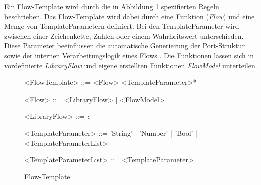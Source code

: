     Ein Flow-Template wird durch die in Abbildung \ref{gra:flow-template} spezifierten Regeln beschrieben.
    Das Flow-Template wird dabei durch eine Funktion (\textit{Flow}) und eine Menge von TemplateParametern definiert. 
    Bei den TemplateParameter wird zwischen einer Zeichenkette, Zahlen oder einem Wahrheitswert unterschieden. 
    Diese Parameter beeinflussen die automatische Generierung der Port-Struktur sowie der internen Verarbeitungslogik eines Flows \cite{99}.
    Die Funktionen lassen sich in vordefinierte \textit{LibraryFlow} und eigene erstellten Funktionen \textit{FlowModel} unterteilen.
    \begin{figure}[H]
        \centering
        \begin{grammar}
            <FlowTemplate> ::= <Flow> <TemplateParameter>*

            <Flow> ::= <LibraryFlow> | <FlowModel>
            
            <LibraryFlow> ::= $\epsilon$

            <TemplateParameter> ::= 'String' | 'Number' | 'Bool' | <TemplateParameterList>
            
            <TemplateParameterList> ::= <TemplateParameter>
        \end{grammar}
        \caption{Flow-Template}    
        \label{gra:flow-template}
    \end{figure}
    \noindent
